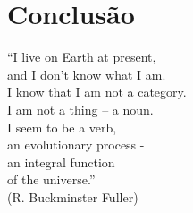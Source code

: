 \chapter{Conclusão}
\label{cap:coclusion}

\begin{flushright}
    ``I live on Earth at present,\\
    and I don’t know what I am. \\
    I know that I am not a category. \\
    I am not a thing -- a noun.\\ 
    I seem to be a verb,\\
    an evolutionary process -\\
    an integral function \\
    of the universe.''\\[10px]
    (R. Buckminster Fuller)
    \end{flushright}
